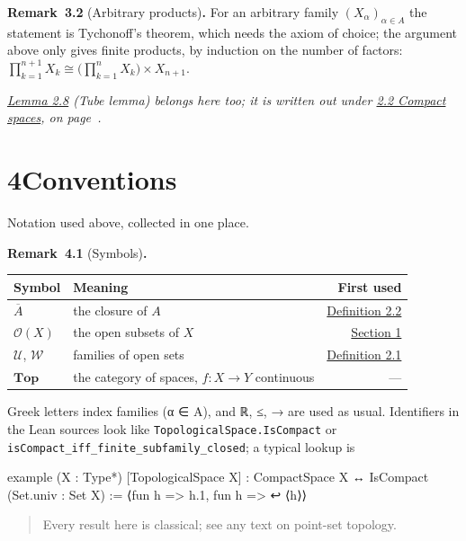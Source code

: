 \documentclass[11pt]{article}
\newenvironment{bpstatement}[2]{\par\addvspace{0.6\baselineskip}\noindent\textbf{#1}#2\textbf{.}\enspace\ignorespaces}
  {\par\addvspace{0.4\baselineskip}}
\newenvironment{bpnote}{\par\small\color{bpmuted}\itshape}{\par}
\providecommand{\Opens}{}\renewcommand{\Opens}[1]{\mathcal{O}(#1)}
\providecommand{\Top}{}\renewcommand{\Top}{\mathbf{Top}}
\providecommand{\cl}{}\renewcommand{\cl}[1]{\overline{#1}}
\providecommand{\fam}{}\renewcommand{\fam}[1]{\mathcal{#1}}
\begin{document}
\label{bp17}%
\begin{bpstatement}{Remark~3.2}{ (Arbitrary products)}
For an arbitrary family \((X_\alpha)_{\alpha \in A}\) the statement is Tychonoff's theorem, which needs the axiom of choice; the argument above only gives finite products, by induction on the number of factors: \(\prod_{k=1}^{n+1} X_k \cong \bigl(\prod_{k=1}^{n} X_k\bigr) \times X_{n+1}\).
\end{bpstatement}

\begin{bpnote}\hyperref[bp14]{Lemma 2.8} (Tube lemma) belongs here too; it is written out under \hyperref[bp7]{2.2 Compact spaces}, on page~\pageref{bp14}.\end{bpnote}

\section*{\texorpdfstring{4\quad Conventions}{4 Conventions}}
\label{bp18}%
Notation used above, collected in one place.
\label{bp19}%
\begin{bpstatement}{Remark~4.1}{ (Symbols)}
\begin{center}\small
\begin{tabular}{llr}
\toprule
Symbol & Meaning & First used \\
\midrule
\(\cl{A}\) & the closure of \(A\) & \hyperref[bp6]{Definition 2.2} \\
\(\Opens{X}\) & the open subsets of \(X\) & \hyperref[bp1]{Section 1} \\
\(\fam{U}\), \(\fam{W}\) & families of open sets & \hyperref[bp5]{Definition 2.1} \\
\(\Top\) & the category of spaces, \(f\colon X \to Y\) continuous & — \\
\bottomrule
\end{tabular}
\end{center}

Greek letters index families (α ∈ A), and ℝ, ≤, → are used as usual. Identifiers in the Lean sources look like \texttt{TopologicalSpace.\allowbreak{}IsCompact} or \texttt{isCompact\_\allowbreak{}iff\_\allowbreak{}finite\_\allowbreak{}subfamily\_\allowbreak{}closed}; a typical lookup is

\begin{bpverbatim}
example (X : Type*) [TopologicalSpace X] :
    CompactSpace X ↔ IsCompact (Set.univ : Set X) := ⟨fun h => h.1, fun h => ↩
  ⟨h⟩⟩
\end{bpverbatim}

\begin{quote}
Every result here is classical; see any text on point-set topology.
\end{quote}
\end{bpstatement}
\end{document}

